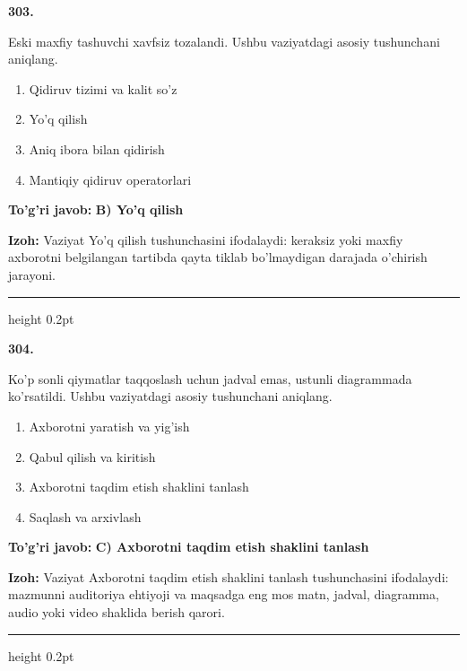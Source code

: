 \documentclass[10pt,a4paper,oneside]{article}
\begin{document}
\noindent\textbf{\color{ink}303.}
\par
Eski maxfiy tashuvchi xavfsiz tozalandi. Ushbu vaziyatdagi asosiy tushunchani aniqlang.
\begin{enumerate}[label=\Alph*),leftmargin=9mm]
\item Qidiruv tizimi va kalit so'z
\item Yo'q qilish
\item Aniq ibora bilan qidirish
\item Mantiqiy qidiruv operatorlari
\end{enumerate}
\begin{tcolorbox}[enhanced,breakable,colback=teal!4,colframe=teal!50!black,boxrule=0.5pt,arc=1.1mm,left=3mm,right=3mm,top=1.7mm,bottom=1.7mm,before skip=2mm,after skip=2mm]
\textbf{\color{teal}To'g'ri javob:} \textbf{B) Yo'q qilish}
\par\smallskip
\textbf{Izoh:} Vaziyat Yo'q qilish tushunchasini ifodalaydi: keraksiz yoki maxfiy axborotni belgilangan tartibda qayta tiklab bo'lmaydigan darajada o'chirish jarayoni.
\end{tcolorbox}
\vspace{2mm}\hrule height 0.2pt \vspace{3mm}

\noindent\textbf{\color{ink}304.}
\par
Ko'p sonli qiymatlar taqqoslash uchun jadval emas, ustunli diagrammada ko'rsatildi. Ushbu vaziyatdagi asosiy tushunchani aniqlang.
\begin{enumerate}[label=\Alph*),leftmargin=9mm]
\item Axborotni yaratish va yig'ish
\item Qabul qilish va kiritish
\item Axborotni taqdim etish shaklini tanlash
\item Saqlash va arxivlash
\end{enumerate}
\begin{tcolorbox}[enhanced,breakable,colback=teal!4,colframe=teal!50!black,boxrule=0.5pt,arc=1.1mm,left=3mm,right=3mm,top=1.7mm,bottom=1.7mm,before skip=2mm,after skip=2mm]
\textbf{\color{teal}To'g'ri javob:} \textbf{C) Axborotni taqdim etish shaklini tanlash}
\par\smallskip
\textbf{Izoh:} Vaziyat Axborotni taqdim etish shaklini tanlash tushunchasini ifodalaydi: mazmunni auditoriya ehtiyoji va maqsadga eng mos matn, jadval, diagramma, audio yoki video shaklida berish qarori.
\end{tcolorbox}
\vspace{2mm}\hrule height 0.2pt \vspace{3mm}
\end{document}
